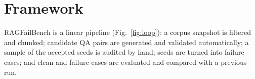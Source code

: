 \documentclass[conference]{IEEEtran}
\begin{document}
\begin{table}[t]
\centering
\caption{Capability comparison with prior RAG evaluation systems.}
\label{tab:compare}
\footnotesize
{}
\end{table}

\section{Framework}
\label{sec:framework}
RAGFailBench is a linear pipeline (Fig.~\ref{fig:loop}): a corpus snapshot is filtered and
chunked; candidate QA pairs are generated and validated automatically; a sample of the
accepted seeds is audited by hand; seeds are turned into failure cases; and clean and failure
cases are evaluated and compared with a previous run.
\end{document}
